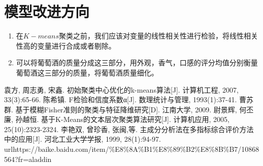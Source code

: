 \documentclass[withoutpreface,bwprint]{cumcmthesis} %
\begin{document}
\section{模型改进方向}
\begin{enumerate}
	\item 在$K-means$聚类之前，我们应该对变量的线性相关性进行检验，将线性相关性高的变量进行合成或者剔除。
	\item 可以将葡萄酒的质量分成这三部分，用外观，香气，口感的评分均值分别衡量葡萄酒这三部分的质量，将葡萄酒质量细化。
\end{enumerate}


\begin{thebibliography}{9}%
  袁方, 周志勇, 宋鑫. 初始聚类中心优化的k-means算法[J]. 计算机工程, 2007, 33(3):65-66.
  陈希镇. F检验和信度系数α[J]. 数理统计与管理, 1993(1):37-41.
  曹苏群. 基于模糊Fisher准则的聚类与特征降维研究[D]. 江南大学, 2009.
  尉景辉, 何丕廉, 孙越恒. 基于K-Means的文本层次聚类算法研究[J]. 计算机应用, 2005, 25(10):2323-2324. 
  李艳双, 曾珍香, 张闽,等. 主成分分析法在多指标综合评价方法中的应用[J]. 河北工业大学学报, 1999, 28(1):94-97.
 url{https://baike.baidu.com/item/\%E8\%8A\%B1\%E8\%89\%B2\%E8\%8B\%B7/10868564?fr=aladdin}
\end{thebibliography}
\end{document}
